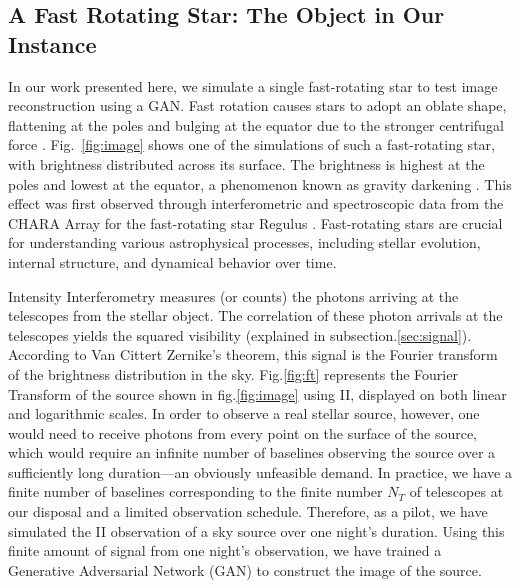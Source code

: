 \subsection{A Fast Rotating Star: The Object in Our Instance}
In our work presented here, we simulate a single fast-rotating star to test image reconstruction using a GAN. Fast rotation causes stars to adopt an oblate shape, flattening at the poles and bulging at the equator due to the stronger centrifugal force \cite{von1924radiative, 1999A&A...347..185M}. Fig.~\ref{fig:image} shows one of the simulations of such a fast-rotating star, with brightness distributed across its surface. The brightness is highest at the poles and lowest at the equator, a phenomenon known as gravity darkening \cite{lucy1967gravity}. This effect was first observed through interferometric and spectroscopic data from the CHARA Array for the fast-rotating star Regulus \cite{mcalister2005first}. Fast-rotating stars are crucial for understanding various astrophysical processes, including stellar evolution, internal structure, and dynamical behavior over time.

Intensity Interferometry measures (or counts) the photons arriving at the telescopes from the stellar object. The correlation of these photon arrivals at the telescopes yields the squared visibility (explained in subsection.\ref{sec:signal}). According to Van Cittert Zernike's theorem, this signal is the Fourier transform of the brightness distribution in the sky. Fig.\ref{fig:ft} represents the Fourier Transform of the source shown in fig.\ref{fig:image} using II, displayed on both linear and logarithmic scales. In order to observe a real stellar source, however, one would need to receive photons from every point on the surface of the source, which would require an infinite number of baselines observing the source over a sufficiently long duration—an obviously unfeasible demand. In practice, we have a finite number of baselines corresponding to the finite number $N_T$ of telescopes at our disposal and a limited observation schedule. Therefore, as a pilot, we have simulated the II observation of a sky source over one night's duration. Using this finite amount of signal from one night's observation, we have trained a Generative Adversarial Network (GAN) to construct the image of the source.

